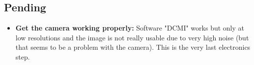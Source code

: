 \subsection{Pending}

\begin{itemize}
	\item \textbf{Get the camera working properly:} Software "DCMI" works but only at low resolutions and the image is not really usable due to very high noise (but that seems to be a problem with the camera). This is the very last electronics step.
\end{itemize}
